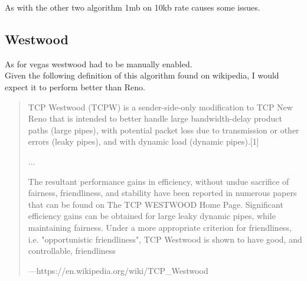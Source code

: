 \documentclass{report}
\begin{document}
As with the other two algorithm 1mb on 10kb rate causes some issues.

\subsection*{Westwood}
As for vegas westwood had to be manually enabled. \\
Given the following definition of this algorithm found on wikipedia, I would expect it to perform better than Reno.

\begin{quote}
  TCP Westwood (TCPW) is a sender-side-only modification to TCP New Reno that is intended to better handle large bandwidth-delay product paths (large pipes), with potential packet loss due to transmission or other errors (leaky pipes), and with dynamic load (dynamic pipes).[1]

...

The resultant performance gains in efficiency, without undue sacrifice of fairness, friendliness, and stability have been reported in numerous papers that can be found on The TCP WESTWOOD Home Page. Significant efficiency gains can be obtained for large leaky dynamic pipes, while maintaining fairness. Under a more appropriate criterion for friendliness, i.e. "opportunistic friendliness", TCP Westwood is shown to have good, and controllable, friendliness
  \begin{flushright}
    \tiny{---https://en.wikipedia.org/wiki/TCP\_Westwood}
  \end{flushright}
\end{quote}
\end{document}
